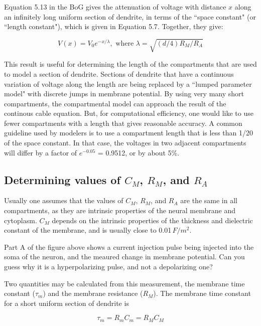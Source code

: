 \documentclass[12pt]{article}
\begin{document}
Equation 5.13 in the BoG gives the attenuation of voltage with distance $x$ along an infinitely long uniform section of dendrite, in terms of the ``space constant" (or ``length constant"), which is given in Equation 5.7. Together, they give:

\begin{displaymath} V(x) = V_0 e^{-x/\lambda}, \mbox{ where } \lambda = \sqrt{(d/4)R_M/R_A} \end{displaymath}

This result is useful for determining the length of the compartments that are used to model a section of dendrite. Sections of dendrite that have a continuous variation of voltage along the length are being replaced by a ``lumped parameter model" with discrete jumps in membrane potential. By using very many short compartments, the compartmental model can approach the result of the continous cable equation. But, for computational efficiency, one would like to use fewer compartments with a length that gives reasonable accuracy. A common guideline used by modelers is to use a compartment length that is less than 1/20 of the space constant. In that case, the voltages in two adjacent compartments will differ by a factor of $e^{-0.05}$ = 0.9512, or by about 5\%.

\subsection*{Determining values of $C_M$, $R_M$, and $R_A$}

Usually one assumes that the values of $C_M$, $R_M$, and $R_A$ are the same in all compartments, as they are intrinsic properties of the neural membrane and cytoplasm. $C_M$ depends on the intrinsic properties of the thickness and dielectric constant of the membrane, and is usually close to 0.01\,$F/m^2$.

Part A of the figure above shows a current injection pulse being injected into the soma of the neuron, and the meaured change in membrane potential. Can you guess why it is a hyperpolarizing pulse, and not a depolarizing one?

Two quantities may be calculated from this measurement, the membrane time constant ($\tau_m$) and the membrane resistance ($R_M$). The membrane time constant for a short uniform section of dendrite is

\begin{displaymath}
	\tau_m = R_mC_m = R_M C_M
\end{displaymath}
\end{document}
